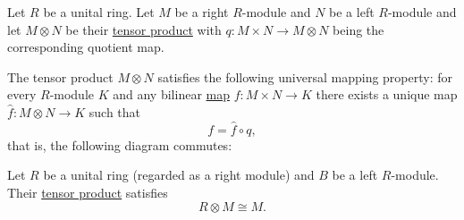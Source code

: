 \begin{theorem}\label{thm:tensor_product_universal_property}
  Let \( R \) be a unital ring. Let \( M \) be a right \( R \)-module and \( N \) be a left \( R \)-module and let \( M \otimes N \) be their \hyperref[def:left_module_tensor_product]{tensor product} with \( q: M \times N \to M \otimes N \) being the corresponding quotient map.

  The tensor product \( M \otimes N \) satisfies the following universal mapping property: for every \( R \)-module \( K \) and any bilinear \hyperref[def:multilinear_function]{map} \( f: M \times N \to K \) there exists a unique map \( \hat f: M \otimes N \to K \) such that
  \begin{equation*}
    f = \hat f \circ q,
  \end{equation*}
  that is, the following diagram commutes:

  \begin{alignedeq}\label{thm:tensor_product_universal_property/diagram}
    \iffalse\begin{mplibcode}
      beginfig(1);
      input metapost/graphs;

      v1 := thelabel("$M \times N$", origin);
      v2 := thelabel("$M \otimes N$", (2, 0) scaled u);
      v3 := thelabel("$K$", (1, -1) scaled u);

      a1 := straight_arc(v1, v2);
      a2 := straight_arc(v2, v3);
      a3 := straight_arc(v1, v3);

      draw_vertices(v);
      draw_arcs(a);

      label.top("$q$", straight_arc_midpoint of a1);
      label.lrt("$\hat f$", straight_arc_midpoint of a2);
      label.llft("$f$", straight_arc_midpoint of a3);
      endfig;
    \end{mplibcode}\fi
  \end{alignedeq}
\end{theorem}

\begin{proposition}\label{thm:tensor_product_with_underlying_ring}
  Let \( R \) be a unital ring (regarded as a right module) and \( B \) be a left \( R \)-module. Their \hyperref[def:left_module_tensor_product]{tensor product} satisfies
  \begin{equation*}
    R \otimes M \cong M.
  \end{equation*}
\end{proposition}

